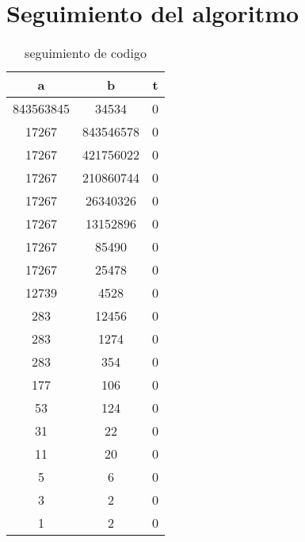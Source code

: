 \section{Seguimiento del algoritmo}
\begin{table}[H]
\label{tablax}
\begin{center}
\begin{tabular}{|c|c|c|}
\hline 
a&b&t \\
\hline
843563845&34534&0\\\hline
17267&843546578&0\\\hline
17267&421756022&0\\\hline
17267&210860744&0\\\hline
17267&26340326&0\\\hline
17267&13152896&0\\\hline
17267&85490&0\\\hline
17267&25478&0\\\hline
12739&4528&0\\\hline
283&12456&0\\\hline
283&1274&0\\\hline
283&354&0\\\hline
177&106&0\\\hline
53&124&0\\\hline
31&22&0\\\hline
11&20&0\\\hline
5&6&0\\\hline
3&2&0\\\hline
1&2&0\\\hline
\end{tabular}
\end{center}
\caption{seguimiento de codigo}
\end{table}



